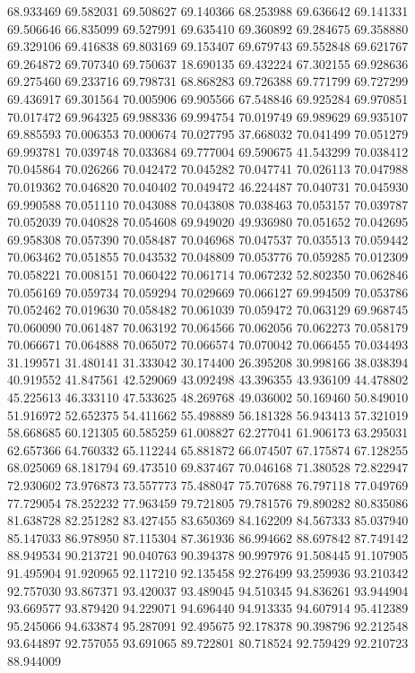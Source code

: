 68.933469
69.582031
69.508627
69.140366
68.253988
69.636642
69.141331
69.506646
66.835099
69.527991
69.635410
69.360892
69.284675
69.358880
69.329106
69.416838
69.803169
69.153407
69.679743
69.552848
69.621767
69.264872
69.707340
69.750637
18.690135
69.432224
67.302155
69.928636
69.275460
69.233716
69.798731
68.868283
69.726388
69.771799
69.727299
69.436917
69.301564
70.005906
69.905566
67.548846
69.925284
69.970851
70.017472
69.964325
69.988336
69.994754
70.019749
69.989629
69.935107
69.885593
70.006353
70.000674
70.027795
37.668032
70.041499
70.051279
69.993781
70.039748
70.033684
69.777004
69.590675
41.543299
70.038412
70.045864
70.026266
70.042472
70.045282
70.047741
70.026113
70.047988
70.019362
70.046820
70.040402
70.049472
46.224487
70.040731
70.045930
69.990588
70.051110
70.043088
70.043808
70.038463
70.053157
70.039787
70.052039
70.040828
70.054608
69.949020
49.936980
70.051652
70.042695
69.958308
70.057390
70.058487
70.046968
70.047537
70.035513
70.059442
70.063462
70.051855
70.043532
70.048809
70.053776
70.059285
70.012309
70.058221
70.008151
70.060422
70.061714
70.067232
52.802350
70.062846
70.056169
70.059734
70.059294
70.029669
70.066127
69.994509
70.053786
70.052462
70.019630
70.058482
70.061039
70.059472
70.063129
69.968745
70.060090
70.061487
70.063192
70.064566
70.062056
70.062273
70.058179
70.066671
70.064888
70.065072
70.066574
70.070042
70.066455
70.034493
31.199571
31.480141
31.333042
30.174400
26.395208
30.998166
38.038394
40.919552
41.847561
42.529069
43.092498
43.396355
43.936109
44.478802
45.225613
46.333110
47.533625
48.269768
49.036002
50.169460
50.849010
51.916972
52.652375
54.411662
55.498889
56.181328
56.943413
57.321019
58.668685
60.121305
60.585259
61.008827
62.277041
61.906173
63.295031
62.657366
64.760332
65.112244
65.881872
66.074507
67.175874
67.128255
68.025069
68.181794
69.473510
69.837467
70.046168
71.380528
72.822947
72.930602
73.976873
73.557773
75.488047
75.707688
76.797118
77.049769
77.729054
78.252232
77.963459
79.721805
79.781576
79.890282
80.835086
81.638728
82.251282
83.427455
83.650369
84.162209
84.567333
85.037940
85.147033
86.978950
87.115304
87.361936
86.994662
88.697842
87.749142
88.949534
90.213721
90.040763
90.394378
90.997976
91.508445
91.107905
91.495904
91.920965
92.117210
92.135458
92.276499
93.259936
93.210342
92.757030
93.867371
93.420037
93.489045
94.510345
94.836261
93.944904
93.669577
93.879420
94.229071
94.696440
94.913335
94.607914
95.412389
95.245066
94.633874
95.287091
92.495675
92.178378
90.398796
92.212548
93.644897
92.757055
93.691065
89.722801
80.718524
92.759429
92.210723
88.944009
